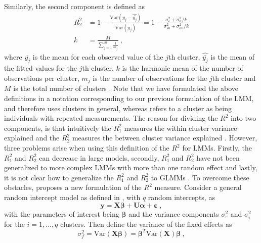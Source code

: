 Similarly, the second component is defined as
\begin{equation}
    \begin{aligned}
    R_2^2 &= 1-\frac{\text{Var} (y_{j} - \hat{\bar{y_{j}}})}{\text{Var} (\overline{y_{j}})} = 1-\frac{\sigma_{\varepsilon}^2 + \sigma^2_{\alpha}/k}{\sigma_{\varepsilon 0}^2 + \sigma^2_{\alpha 0}/k} \\
    k &= \frac{M}{\sum_{j=1}^M \frac{1}{m_j}} \ ,
    \end{aligned}
\end{equation}
where $\overline{y_j}$ is the mean for each observed value of the $j$th cluster, $\hat{\bar {y_j}}$ is the mean of the fitted values for the $j$th cluster, $k$ is the harmonic mean of the number of observations per cluster, $m_j$ is the number of observations for the $j$th cluster and $M$ is the total number of clusters \citep{nakagawa2013general}. 
Note that we have formulated the above definitions in a notation corresponding to our previous formulation of the LMM, and therefore uses clusters in general, whereas \citet{nakagawa2013general} refers to a cluster as being individuals with repeated measurements.
The reason for dividing the $R^2$ into two components, is that intuitively the $R^2_1$ measures the within cluster variance explained  and the $R^2_2$ measures the between cluster variance explained \citep{nakagawa2013general}.
However, three problems arise when using this definition of the $R^2$ for LMMs. 
Firstly, the $R^2_1$ and $R^2_2$ can decrease in large models, secondly, $R_1^2$ and $R_2^2$ have not been generalized to more complex LMMs with more than one random effect and lastly, it is not clear how to generalize the $R_1^2$ and $R_2^2$ to GLMMs \citep{nakagawa2013general}.
To overcome these obstacles, \citet{nakagawa2013general} proposes a new formulation of the $R^2$ measure. 
Consider a general random intercept model as defined in , with $q$ random intercepts, as
\begin{equation}
    \mathbf{y} = \mathbf{X}\boldsymbol{\beta} + \mathbf{U}\boldsymbol{\alpha} + \boldsymbol{\varepsilon} \ ,
\end{equation}
with the parameters of interest being $\boldsymbol{\beta}$ and the variance components $\sigma^2_{\varepsilon}$ and $\sigma^2_{i}$ for the $i=1, ..., q$ clusters.
Then define the variance of the fixed effects as 
\begin{equation}
    \sigma^2_f = \text{Var}(\mathbf{X}\boldsymbol{\beta}) = \boldsymbol{\beta}^T\text{Var}(\mathbf{X})\boldsymbol{\beta} \ ,
\end{equation}
